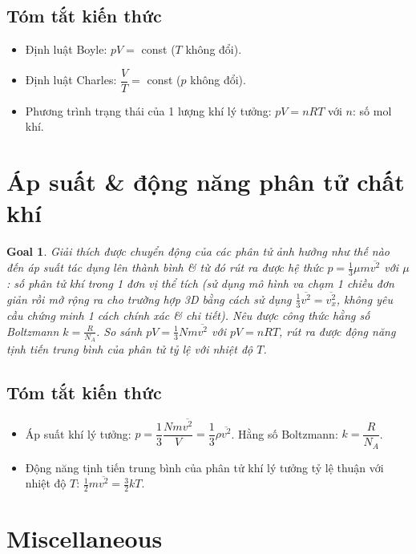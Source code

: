 \documentclass{article}
\newtheorem{goal}{Goal}
\begin{document}
\subsection{Tóm tắt kiến thức}

\begin{itemize}
	\item Định luật Boyle: $pV =$ const ($T$ không đổi).
	\item Định luật Charles: $\dfrac{V}{T} =$ const ($p$ không đổi).
	\item Phương trình trạng thái của 1 lượng khí lý tưởng: $pV = nRT$ với $n$: số mol khí.
\end{itemize}


\section{Áp suất \& động năng phân tử chất khí}

\begin{goal}
	Giải thích được chuyển động của các phân tử ảnh hưởng như thế nào đến áp suất tác dụng lên thành bình \& từ đó rút ra được hệ thức $p = \frac{1}{3}\mu m\overline{v^2}$ với $\mu$: số phân tử khí trong 1 đơn vị thể tích (sử dụng mô hình va chạm 1 chiều đơn giản rồi mở rộng ra cho trường hợp 3D bằng cách sử dụng $\frac{1}{3}\overline{v^2} = \overline{v_x^2}$, không yêu cầu chứng minh 1 cách chính xác \& chi tiết). Nêu được {\it công thức hằng số Boltzmann} $k = \frac{R}{N_A}$. So sánh $pV = \frac{1}{3}Nm\overline{v^2}$ với $pV = nRT$, rút ra được động năng tịnh tiến trung bình của phân tử tỷ lệ với nhiệt độ $T$.
\end{goal}

\subsection{Tóm tắt kiến thức}

\begin{itemize}
	\item Áp suất khí lý tưởng: $p = \dfrac{1}{3}\dfrac{Nm\overline{v^2}}{V} = \dfrac{1}{3}\rho\overline{v^2}$. Hằng số Boltzmann: $k = \dfrac{R}{N_A}$.
	\item Động năng tịnh tiến trung bình của phân tử khí lý tưởng tỷ lệ thuận với nhiệt độ $T$: $\frac{1}{2}m\overline{v^2} = \frac{3}{2}kT$.
\end{itemize}


\section{Miscellaneous}


\printbibliography[heading=bibintoc]
	
\end{document}
